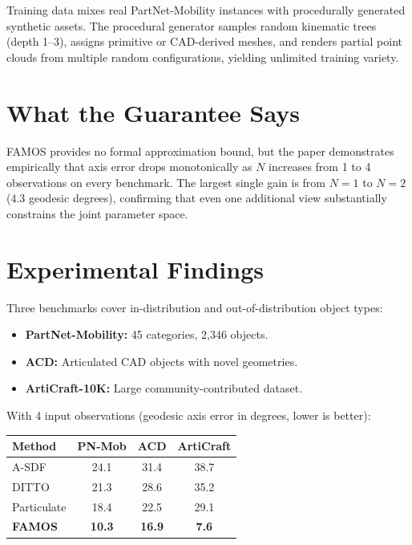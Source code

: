 \documentclass[10pt,twocolumn]{article}
\begin{document}
Training data mixes real PartNet-Mobility instances with procedurally
generated synthetic assets. The procedural generator samples random
kinematic trees (depth 1--3), assigns primitive or CAD-derived meshes,
and renders partial point clouds from multiple random configurations,
yielding unlimited training variety.

\section{What the Guarantee Says}

FAMOS provides no formal approximation bound, but the paper demonstrates
empirically that axis error drops monotonically as $N$ increases from 1 to
4 observations on every benchmark. The largest single gain is from $N{=}1$
to $N{=}2$ (4.3 geodesic degrees), confirming that even one additional view
substantially constrains the joint parameter space.

\section{Experimental Findings}

Three benchmarks cover in-distribution and out-of-distribution object types:
\begin{itemize}[itemsep=2pt,parsep=0pt]
  \item \textbf{PartNet-Mobility:} 45 categories, 2,346 objects.
  \item \textbf{ACD:} Articulated CAD objects with novel geometries.
  \item \textbf{ArtiCraft-10K:} Large community-contributed dataset.
\end{itemize}

With 4 input observations (geodesic axis error in degrees, lower is better):

\begin{center}
\small
\begin{tabular}{lccc}
\toprule
Method & PN-Mob & ACD & ArtiCraft \\
\midrule
A-SDF & 24.1 & 31.4 & 38.7 \\
DITTO & 21.3 & 28.6 & 35.2 \\
Particulate & 18.4 & 22.5 & 29.1 \\
\textbf{FAMOS} & \textbf{10.3} & \textbf{16.9} & \textbf{7.6} \\
\bottomrule
\end{tabular}
\end{center}
\end{document}
